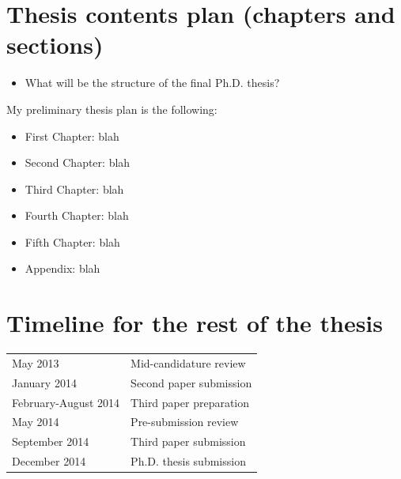 \documentclass[useAMS,usenatbib,onecolumn]{mnras}
\begin{document}

\section{Thesis contents plan (chapters and sections)}
\label{sec:thesisContents}

\begin{itemize}
	\item{What will be the structure of the final Ph.D. thesis?\\}
\end{itemize}

  My preliminary thesis plan is the following:
  \begin{itemize}
    \item{First Chapter: } blah
    \item{Second Chapter:} blah
    \item{Third Chapter:} blah
    \item{Fourth Chapter:} blah
    \item{Fifth Chapter:} blah
    \item{Appendix:} blah
  \end{itemize}



\section{Timeline for the rest of the thesis}
\label{sec:timeline}

\begin{tabular*}{0.75\textwidth}{ l l }
  May 2013                  & Mid-candidature review \\
  January 2014                & Second paper submission \\
  February-August 2014              & Third paper preparation \\
  May 2014                  & Pre-submission review \\
  September 2014              & Third paper submission \\
  December 2014               & Ph.D. thesis submission \\
\end{tabular*}


\begin{multicols}{2}
	
	{\footnotesize
	\setlength{\itemsep}{1pt}
	\begin{spacing}{0.5}
		{}
	\end{spacing}	}
\end{multicols}
\end{document}
